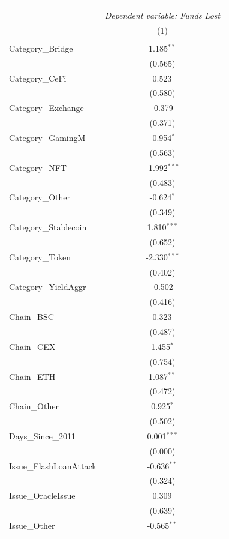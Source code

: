 \begin{table}[!htbp] \centering
\begin{tabular}{@{\extracolsep{5pt}}lc}
\\[-1.8ex]\hline
\hline \\[-1.8ex]
& \multicolumn{1}{c}{\textit{Dependent variable: Funds Lost}} \
\cr \cline{2-2}
\\[-1.8ex] & (1) \\
\hline \\[-1.8ex]
 Category\_Bridge & 1.185$^{**}$ \\
& (0.565) \\
 Category\_CeFi & 0.523$^{}$ \\
& (0.580) \\
 Category\_Exchange & -0.379$^{}$ \\
& (0.371) \\
 Category\_GamingM & -0.954$^{*}$ \\
& (0.563) \\
 Category\_NFT & -1.992$^{***}$ \\
& (0.483) \\
 Category\_Other & -0.624$^{*}$ \\
& (0.349) \\
 Category\_Stablecoin & 1.810$^{***}$ \\
& (0.652) \\
 Category\_Token & -2.330$^{***}$ \\
& (0.402) \\
 Category\_YieldAggr & -0.502$^{}$ \\
& (0.416) \\
 Chain\_BSC & 0.323$^{}$ \\
& (0.487) \\
 Chain\_CEX & 1.455$^{*}$ \\
& (0.754) \\
 Chain\_ETH & 1.087$^{**}$ \\
& (0.472) \\
 Chain\_Other & 0.925$^{*}$ \\
& (0.502) \\
 Days\_Since\_2011 & 0.001$^{***}$ \\
& (0.000) \\
 Issue\_FlashLoanAttack & -0.636$^{**}$ \\
& (0.324) \\
 Issue\_OracleIssue & 0.309$^{}$ \\
& (0.639) \\
 Issue\_Other & -0.565$^{**}$ \\

\end{tabular}
\end{table}
